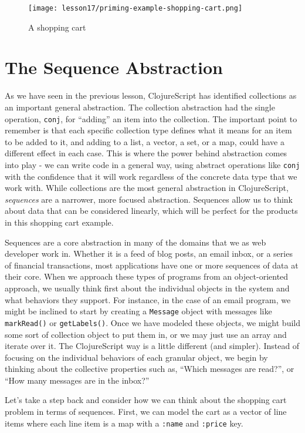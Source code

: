 \documentclass[10pt,twoside,openright]{memoir}
\begin{document}
\begin{figure}[H]
\caption{A shopping cart}
\centering
\texttt{[image: lesson17/priming-example-shopping-cart.png]}
\end{figure}

\section{The Sequence Abstraction}

As we have seen in the previous lesson, ClojureScript has identified
collections as an important general abstraction. The collection
abstraction had the single operation, \texttt{conj}, for ``adding'' an
item into the collection. The important point to remember is that each
specific collection type defines what it means for an item to be added
to it, and adding to a list, a vector, a set, or a map, could have a
different effect in each case. This is where the power behind
abstraction comes into play - we can write code in a general way, using
abstract operations like \texttt{conj} with the confidence that it will
work regardless of the concrete data type that we work with. While
collections are the most general abstraction in ClojureScript,
\emph{sequences} are a narrower, more focused abstraction. Sequences
allow us to think about data that can be considered linearly, which will
be perfect for the products in this shopping cart example.

Sequences are a core abstraction in many of the domains that we as web
developer work in. Whether it is a feed of blog posts, an email inbox,
or a series of financial transactions, most applications have one or
more sequences of data at their core. When we approach these types of
programs from an object-oriented approach, we usually think first about
the individual objects in the system and what behaviors they support.
For instance, in the case of an email program, we might be inclined to
start by creating a \texttt{Message} object with messages like
\texttt{markRead()} or \texttt{getLabels()}. Once we have modeled these
objects, we might build some sort of collection object to put them in,
or we may just use an array and iterate over it. The ClojureScript way
is a little different (and simpler). Instead of focusing on the
individual behaviors of each granular object, we begin by thinking about
the collective properties such as, ``Which messages are read?'', or
``How many messages are in the inbox?''

Let's take a step back and consider how we can think about the shopping
cart problem in terms of sequences. First, we can model the cart as a
vector of line items where each line item is a map with a \texttt{:name}
and \texttt{:price} key.
\end{document}
